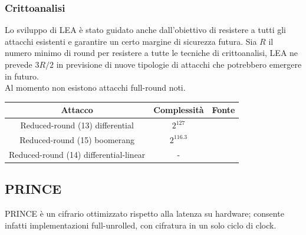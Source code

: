 \documentclass[target=bach,aauheader=,style=]{thud}
\begin{document}
			\subsubsection{Crittoanalisi}
			Lo sviluppo di LEA è stato guidato anche dall'obiettivo di resistere a tutti gli attacchi esistenti e garantire un certo margine di sicurezza futura. Sia $R$ il numero minimo di round per resistere a tutte le tecniche di crittoanalisi, LEA ne prevede $3R/2$ in previsione di nuove tipologie di attacchi che potrebbero emergere in futuro.\\
			Al momento non esistono attacchi full-round noti.
			\begin{center}
				\begin{tabular}{ |c|c|c| } 
					\hline
					Attacco & Complessità & Fonte \\ 
					\hline 
					\hline
					Reduced-round (13) differential & $2^{127}$ & \cite{leadiff} \\
					\hline
					Reduced-round (15) boomerang & $2^{116.3}$ & \cite{lea} \\
					\hline
					Reduced-round (14) differential-linear & - & \cite{lea} \\
					\hline
				\end{tabular}
			\end{center}
		\subsection{PRINCE\cite{prince}}
			PRINCE è un cifrario ottimizzato rispetto alla latenza su  hardware; consente infatti implementazioni full-unrolled, con cifratura in un solo ciclo di clock.
\end{document}
